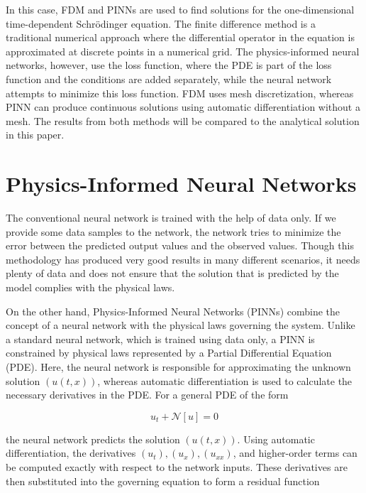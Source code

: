 \documentclass[11pt]{article}
\begin{document}
In this case, FDM and PINNs are used to find solutions for the one-dimensional time-dependent Schrödinger equation. 
The finite difference method is a traditional numerical approach where the differential operator in 
the equation is approximated at discrete points in a numerical grid. 
The physics-informed neural networks, however, use the loss function, where the PDE is part of the loss 
function and the conditions are added separately, while the neural network attempts to minimize this loss 
function. FDM uses mesh discretization, whereas PINN can produce continuous solutions using automatic 
differentiation without a mesh. The results from both methods will be compared to the analytical 
solution in this paper.



\section{Physics-Informed Neural Networks}


The conventional neural network is trained with the help of data only. If we provide some data samples to 
the network, the network tries to minimize the error between the predicted output values and the observed
 values. Though this methodology has produced very good results in many different scenarios, it needs plenty 
 of data and does not ensure that the solution that is predicted by the model complies with the physical laws.

On the other hand, Physics-Informed Neural Networks (PINNs) combine the concept of a neural network with the 
physical laws governing the system. Unlike a standard neural network, which is trained using data only, 
a PINN is constrained by physical laws represented by a Partial Differential Equation (PDE). 
Here, the neural network is responsible for approximating the unknown solution $(u(t,x))$, whereas automatic
differentiation is used to calculate the necessary derivatives in the PDE.
For a general PDE of the form

\begin{equation}
u_t + \mathcal{N}[u] = 0
\end{equation}



the neural network predicts the solution $(u(t,x))$. Using automatic differentiation, 
the derivatives $(u_t), (u_x), (u_{xx})$, and higher-order terms can be computed exactly with respect to the network inputs. 
These derivatives are then substituted into the governing equation to form a residual function
\end{document}
